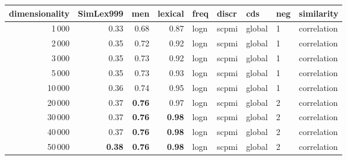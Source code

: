 \begin{tabular}{rrrrlllll}
\toprule
 dimensionality &  SimLex999 &   men &  lexical &  freq &  discr &     cds & neg &   similarity \\
\midrule
           1\,000 &       0.33 &  0.68 &     0.87 &  logn &  scpmi &  global &   1 &  correlation \\
           2\,000 &       0.35 &  0.72 &     0.92 &  logn &  scpmi &  global &   1 &  correlation \\
           3\,000 &       0.35 &  0.73 &     0.92 &  logn &  scpmi &  global &   1 &  correlation \\
           5\,000 &       0.35 &  0.73 &     0.93 &  logn &  scpmi &  global &   1 &  correlation \\
          10\,000 &       0.36 &  0.74 &     0.95 &  logn &  scpmi &  global &   1 &  correlation \\
          20\,000 &       0.37 &  \textbf{0.76} &     0.97 &  logn &  scpmi &  global &   2 &  correlation \\
          30\,000 &       0.37 &  \textbf{0.76} &     \textbf{0.98} &  logn &  scpmi &  global &   2 &  correlation \\
          40\,000 &       0.37 &  \textbf{0.76} &     \textbf{0.98} &  logn &  scpmi &  global &   2 &  correlation \\
          50\,000 &       \textbf{0.38} &  \textbf{0.76} &     \textbf{0.98} &  logn &  scpmi &  global &   2 &  correlation \\
\bottomrule
\end{tabular}
